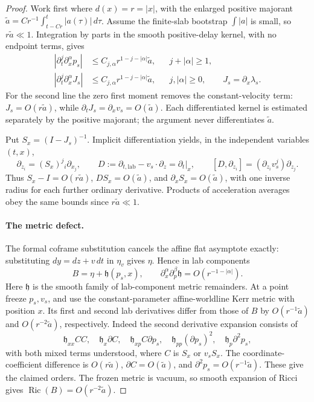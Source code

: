 \begin{proof}
Work first where $d(x)=r=|x|$, with the enlarged positive majorant
$\widetilde a=Cr^{-1}\int_{t-Cr}^t|a(\tau)|\,d\tau$.
Assume the finite-slab bootstrap $\int|a|$ is small, so $r\widetilde a\ll1$.
Integration by parts in the smooth positive-delay kernel, with no endpoint terms, gives
\begin{equation}\label{st:smoothed-jets}
 \begin{aligned}
 |\partial_t^j\partial_x^\alpha p_s|
   &\le C_{j,\alpha}r^{1-j-|\alpha|}\widetilde a,
       &&j+|\alpha|\ge1,\\
 |\partial_t^j\partial_x^\alpha J_s|
   &\le C_{j,\alpha}r^{1-j-|\alpha|}\widetilde a,
       &&j,|\alpha|\ge0,\qquad J_s=\partial_x\lambda_s.
 \end{aligned}
\end{equation}
For the second line the zero first moment removes the constant-velocity term: \(J_s=O(r\widetilde a)\), while \(\partial_tJ_s=\partial_xv_s=O(\widetilde a)\). Each differentiated kernel is estimated separately by the positive majorant; the argument never differentiates \(\widetilde a\).

Put \(S_x=(I-J_s)^{-1}\). Implicit differentiation yields, in the independent variables \((t,x)\),
\begin{equation}\label{st:target-frame}
 \partial_{z_i}=(S_x)^j{}_i\partial_{x_j},\qquad
 D:=\partial_{t,\mathrm{lab}}-v_s\cdot\partial_z=\partial_t|_x,
 \qquad [D,\partial_{z_i}]
       =(\partial_{z_i}v_s^j)\partial_{z_j}.
\end{equation}
Thus \(S_x-I=O(r\widetilde a)\), \(DS_x=O(\widetilde a)\), and \(\partial_xS_x=O(\widetilde a)\), with one inverse radius for each further ordinary derivative. Products of acceleration averages obey the same bounds since \(r\widetilde a\ll1\).

\paragraph{The metric defect.}
The formal coframe substitution cancels the affine flat asymptote exactly: substituting \(dy=dz+v\,dt\) in \(\eta_v\) gives \(\eta\). Hence in lab components
\[
 B=\eta+\mathfrak h(p_s,x),\qquad
 \partial_x^\alpha\partial_p^\beta\mathfrak h=O(r^{-1-|\alpha|}).
\]
Here \(\mathfrak h\) is the smooth family of lab-component metric remainders. At a point freeze \(p_s,v_s\), and use the constant-parameter affine-worldline Kerr metric with position \(x\). Its first and second lab derivatives differ from those of \(B\) by
\(O(r^{-1}\widetilde a)\) and \(O(r^{-2}\widetilde a)\), respectively. Indeed the second derivative expansion consists of
\[
 \mathfrak h_{xx}CC,\quad \mathfrak h_x\partial C,\quad
 \mathfrak h_{xp}C\partial p_s,\quad \mathfrak h_{pp}(\partial p_s)^2,\quad
 \mathfrak h_p\partial^2p_s,
\]
with both mixed terms understood, where \(C\) is \(S_x\) or \(v_sS_x\). The coordinate-coefficient difference is \(O(r\widetilde a)\), \(\partial C=O(\widetilde a)\), and \(\partial^2p_s=O(r^{-1}\widetilde a)\). These give the claimed orders. The frozen metric is vacuum, so smooth expansion of Ricci gives \(\operatorname{Ric}(B)=O(r^{-2}\widetilde a)\).


\end{proof}
